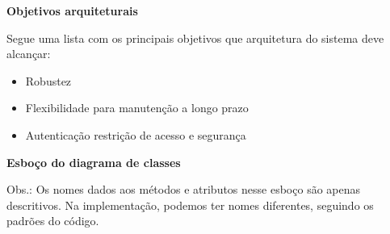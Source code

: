 \documentclass[12pt,letterpaper]{article}
\begin{document}
\vspace{1cm}
{\large {\bf Objetivos arquiteturais}}
\vspace{0.5cm}

Segue uma lista com os principais objetivos que arquitetura do sistema deve alcançar:
\begin{itemize}
\item{}Robustez
\item{}Flexibilidade para manutenção a longo prazo
\item{}Autenticação restrição de acesso e segurança
\end{itemize}
\pagebreak

\vspace{1cm}
{\large {\bf Esboço do diagrama de classes}}
\vspace{0.5cm}

Obs.: Os nomes dados aos métodos e atributos nesse esboço são apenas descritivos. Na implementação, podemos ter nomes diferentes, seguindo os padrões do código.\\

\end{document}
